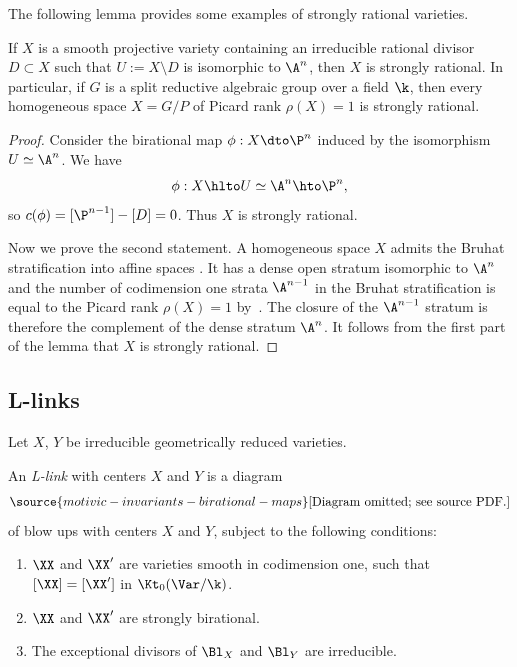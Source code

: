 The following lemma provides some examples
of strongly rational varieties.

\begin{lemma}
\notready\label{lem:GP-strongly-rational}
If $X$ is a smooth projective variety
containing an irreducible rational
divisor $D \subset X$
such that $U := X \setminus D$
is isomorphic to $\A^n$,
then $X$ is strongly rational.
In particular, if $G$ is a split reductive
algebraic group over a field $\k$,
then every
homogeneous space
$X = G/P$
of Picard rank $\rho(X) = 1$
is strongly rational.
\end{lemma}
\begin{proof}
Consider the birational map
$\phi :  X \dto \P^n$
induced by the isomorphism $U \simeq \A^n$.
We have
\[
\phi: X \hlto U \simeq \A^n \hto \P^n,
\]
so $c(\phi) = [\P^{n-1}] - [D] = 0$.
Thus $X$ is strongly rational.

Now we prove the second statement.
A homogeneous space $X$ admits
the Bruhat stratification
into affine spaces \cite[Proposition 1.3]{Kock}.
It has a dense open stratum isomorphic to $\A^n$ and
the number of codimension one strata
$\A^{n-1}$ in the Bruhat stratification
is equal to the Picard rank $\rho(X) = 1$ by~\cite[Example 1.9.1]{Fulton}.
The closure of the
$\A^{n-1}$ stratum
is therefore the complement of the dense stratum $\A^n$.
It follows from the first part of the lemma that $X$
is strongly rational.
\end{proof}





\subsection{L-links}



Let $X$, $Y$ be
irreducible geometrically reduced
varieties.

\begin{Def}
An \emph{L-link} with centers $X$ and $Y$
is a diagram
\begin{equation}\label{eq:L-link}
\source{motivic-invariants-birational-maps}
 \text{[Diagram omitted; see source PDF.]}
\end{equation}
of blow ups with centers $X$ and $Y$,
subject to the following conditions:
\begin{enumerate}
    \item[(L1)] $\XX$ and $\XX'$ are
 varieties smooth in codimension one,
 such that $[\XX] = [\XX']$ in $\Kt_0(\Var/\k)$.
    \item[(L2)]
    $\XX$ and $\XX'$ are strongly birational.
    \item[(L3)]
    The exceptional divisors of
    $\Bl_{X}$ and $\Bl_{Y}$ are irreducible.
\end{enumerate}
\end{Def}

